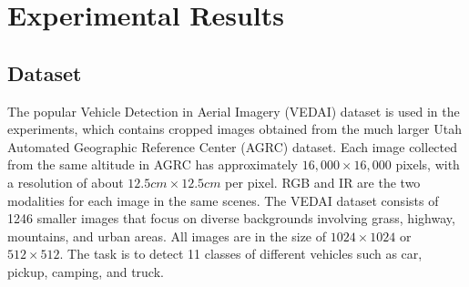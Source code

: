 \section{Experimental Results}
\label{sec:Experiment}


\subsection{Dataset}
The popular Vehicle Detection in Aerial Imagery (VEDAI) dataset  \cite{razakarivony2016vehicle} is used in the experiments, which contains cropped images obtained from the much larger Utah Automated Geographic Reference Center (AGRC) dataset. Each image collected from the same altitude in AGRC has approximately $16,000\times 16,000$ pixels, with a resolution of about $ 12.5 cm \times 12.5 cm $ per pixel. RGB and IR are the two modalities for each image in the same scenes. The VEDAI dataset consists of 1246 smaller images that focus on diverse backgrounds involving grass, highway, mountains, and urban areas. All images are in the size of $1024\times 1024$ or $512 \times 512 $. The task is to detect 11 classes of different vehicles such as car, pickup, camping, and truck. 







